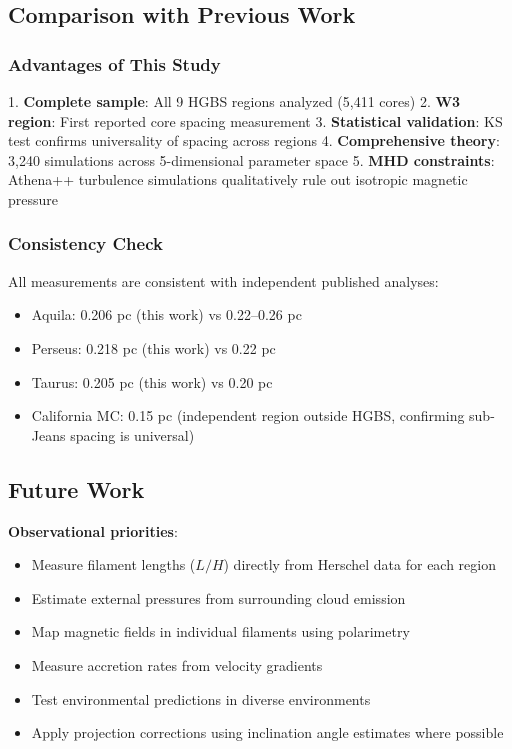 \documentclass[11pt,a4paper]{article}
\begin{document}
\subsection{Comparison with Previous Work}

\subsubsection{Advantages of This Study}

1. \textbf{Complete sample}: All 9 HGBS regions analyzed (5,411 cores)
2. \textbf{W3 region}: First reported core spacing measurement
3. \textbf{Statistical validation}: KS test confirms universality of spacing across regions
4. \textbf{Comprehensive theory}: 3,240 simulations across 5-dimensional parameter space
5. \textbf{MHD constraints}: Athena++ turbulence simulations qualitatively rule out isotropic magnetic pressure

\subsubsection{Consistency Check}

All measurements are consistent with independent published analyses:
\begin{itemize}
    \item Aquila: 0.206 pc (this work) vs 0.22--0.26 pc \citep{Arzoumanian2019}
    \item Perseus: 0.218 pc (this work) vs 0.22 pc \citep{Andre2016}
    \item Taurus: 0.205 pc (this work) vs 0.20 pc \citep{Andre2014}
    \item California MC: 0.15 pc \citep{Zhang2024} (independent region outside HGBS, confirming sub-Jeans spacing is universal)
\end{itemize}

\subsection{Future Work}

\textbf{Observational priorities}:
\begin{itemize}
    \item Measure filament lengths ($L/H$) directly from Herschel data for each region
    \item Estimate external pressures from surrounding cloud emission
    \item Map magnetic fields in individual filaments using polarimetry
    \item Measure accretion rates from velocity gradients \citep{Chen2024}
    \item Test environmental predictions in diverse environments
    \item Apply projection corrections using inclination angle estimates where possible
\end{itemize}
\end{document}
